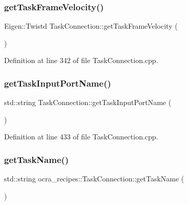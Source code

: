 \subsubsection{\texorpdfstring{get\+Task\+Frame\+Velocity()}{getTaskFrameVelocity()}}
{\footnotesize\ttfamily Eigen\+::\+Twistd Task\+Connection\+::get\+Task\+Frame\+Velocity (\begin{DoxyParamCaption}{ }\end{DoxyParamCaption})}



Definition at line 342 of file Task\+Connection.\+cpp.

\hypertarget{classocra__recipes_1_1TaskConnection_ac6368ebb5b32d5319cec98fcf09d38fd}{}\label{classocra__recipes_1_1TaskConnection_ac6368ebb5b32d5319cec98fcf09d38fd} 
\subsubsection{\texorpdfstring{get\+Task\+Input\+Port\+Name()}{getTaskInputPortName()}}
{\footnotesize\ttfamily std\+::string Task\+Connection\+::get\+Task\+Input\+Port\+Name (\begin{DoxyParamCaption}{ }\end{DoxyParamCaption})}



Definition at line 433 of file Task\+Connection.\+cpp.

\hypertarget{classocra__recipes_1_1TaskConnection_ad33b58e0bf6e0f7051b0187435b014f9}{}\label{classocra__recipes_1_1TaskConnection_ad33b58e0bf6e0f7051b0187435b014f9} 
\subsubsection{\texorpdfstring{get\+Task\+Name()}{getTaskName()}}
{\footnotesize\ttfamily std\+::string ocra\+\_\+recipes\+::\+Task\+Connection\+::get\+Task\+Name (\begin{DoxyParamCaption}{ }\end{DoxyParamCaption})\hspace{0.3cm}{\ttfamily [inline]}}

